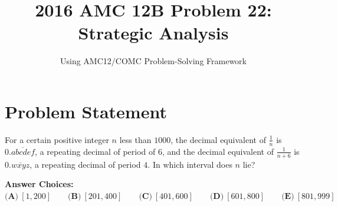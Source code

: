 \documentclass[11pt]{article}
\title{\textbf{2016 AMC 12B Problem 22: Strategic Analysis}}
\author{Using AMC12/COMC Problem-Solving Framework}
\date{}
\begin{document}
\maketitle

\section*{Problem Statement}
For a certain positive integer $n$ less than $1000$, the decimal equivalent of $\frac{1}{n}$ is $0.\overline{abcdef}$, a repeating decimal of period of $6$, and the decimal equivalent of $\frac{1}{n+6}$ is $0.\overline{wxyz}$, a repeating decimal of period $4$. In which interval does $n$ lie?

\textbf{Answer Choices:} 
$\textbf{(A)}\ [1,200]\qquad\textbf{(B)}\ [201,400]\qquad\textbf{(C)}\ [401,600]\qquad\textbf{(D)}\ [601,800]\qquad\textbf{(E)}\ [801,999]$
\end{document}
